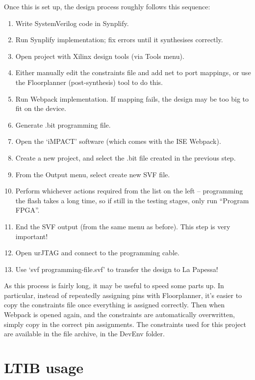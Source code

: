 	Once this is set up, the design process roughly follows this sequence:
	\begin{enumerate}
		\item Write SystemVerilog code in Synplify.
		\item Run Synplify implementation; fix errors until it synthesises correctly.
		\item Open project with Xilinx design tools (via Tools menu).
		\item Either manually edit the constraints file and add net to port mappings, or use the Floorplanner (post-synthesis) tool to do this.
		\item Run Webpack implementation.  If mapping fails, the design may be too big to fit on the device.
		\item Generate .bit programming file.
		\item Open the `iMPACT' software (which comes with the ISE Webpack).
		\item Create a new project, and select the .bit file created in the previous step.
		\item From the Output menu, select create new SVF file.
		\item Perform whichever actions required from the list on the left -- programming the flash takes a long time, so if still in the testing stages, only run ``Program FPGA''.
		\item End the SVF output (from the same menu as before).  This step is very important!
		\item Open urJTAG and connect to the programming cable.
		\item Use `svf programming-file.svf' to transfer the design to La Papessa!
	\end{enumerate}

	As this process is fairly long, it may be useful to speed some parts up.  In particular, instead of repeatedly assigning pins with Floorplanner, it's easier to copy the constraints file once everything is assigned correctly.  Then when Webpack is opened again, and the constraints are automatically overwritten, simply copy in the correct pin assignments.  The constraints used for this project are available in the file archive, in the DevEnv folder.



\section{LTIB usage} %
\label{apdx:ltib_usage}

